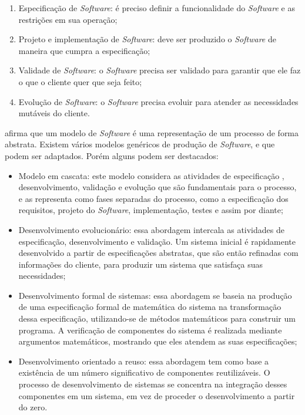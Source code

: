 \begin{enumerate}
    \item Especificação de \textit{Software}: é preciso definir a funcionalidade do \textit{Software} e as restrições em sua operação;

    \item Projeto e implementação de \textit{Software}: deve ser produzido o \textit{Software} de maneira que cumpra a especificação;

    \item Validade de \textit{Software}: o \textit{Software} precisa ser validado para garantir que ele faz o que o cliente quer que seja feito;

    \item Evolução de \textit{Software}: o \textit{Software} precisa evoluir para atender as necessidades mutáveis do cliente.
\end{enumerate}


\cite{sommerville2011software} afirma que um modelo de \textit{Software} é uma representação de um processo de forma abstrata. Existem vários modelos genéricos de produção de \textit{Software}, e que podem ser adaptados. Porém alguns podem ser destacados:

\begin{itemize}
    \item Modelo em cascata: este modelo considera as atividades de especificação
        , desenvolvimento, validação e evolução que são fundamentais para 
        o processo, e as representa como fases separadas do processo, como 
        a especificação dos requisitos, projeto do \textit{Software}, implementação, testes e assim por diante;

    \item Desenvolvimento evolucionário: essa abordagem intercala as atividades 
        de especificação, desenvolvimento e validação. Um sistema inicial 
        é rapidamente desenvolvido a partir de especificações abstratas, 
        que são então refinadas com informações do cliente, para produzir 
        um sistema que satisfaça suas necessidades;


    \item Desenvolvimento formal de sistemas: essa abordagem se baseia 
        na produção de uma especificação formal de matemática do sistema 
        na transformação dessa especificação, utilizando-se de métodos 
        matemáticos para construir um programa. A verificação de componentes 
        do sistema é realizada mediante argumentos matemáticos, mostrando 
        que eles atendem as suas especificações;

    \item Desenvolvimento orientado a reuso: essa abordagem tem como base 
        a existência de um número significativo de componentes reutilizáveis.
        O processo de desenvolvimento de sistemas se concentra na integração 
        desses componentes em um sistema, em vez de proceder o desenvolvimento 
        a partir do zero.

\end{itemize}

